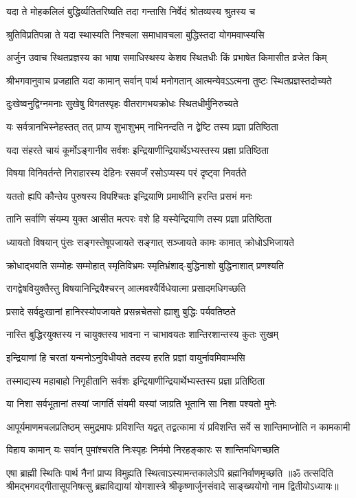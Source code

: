 \twolineshloka
{यदा ते मोहकलिलं बुद्धिर्व्यतितरिष्यति}
{तदा गन्तासि निर्वेदं श्रोतव्यस्य श्रुतस्य च}%

\twolineshloka
{श्रुतिविप्रतिपन्ना ते यदा स्थास्यति निश्चला}
{समाधावचला बुद्धिस्तदा योगमवाप्स्यसि}%

{अर्जुन उवाच}
\twolineshloka
{स्थितप्रज्ञस्य का भाषा समाधिस्थस्य केशव}
{स्थितधीः किं प्रभाषेत किमासीत व्रजेत किम्}%

{श्रीभगवानुवाच}
\twolineshloka
{प्रजहाति यदा कामान् सर्वान् पार्थ मनोगतान्}
{आत्मन्येवऽऽत्मना तुष्टः स्थितप्रज्ञस्तदोच्यते}%

\twolineshloka
{दुःखेष्वनुद्विग्नमनाः सुखेषु विगतस्पृहः}
{वीतरागभयक्रोधः स्थितधीर्मुनिरुच्यते}%

\twolineshloka
{यः सर्वत्रानभिस्नेहस्तत् तत् प्राप्य शुभाशुभम्}
{नाभिनन्दति न द्वेष्टि तस्य प्रज्ञा प्रतिष्ठिता}%

\twolineshloka
{यदा संहरते चायं कूर्मोऽङ्गानीव सर्वशः}
{इन्द्रियाणीन्द्रियार्थेऽभ्यस्तस्य प्रज्ञा प्रतिष्ठिता}%

\twolineshloka
{विषया विनिवर्तन्ते निराहारस्य देहिनः}
{रसवर्जं रसोऽप्यस्य परं दृष्ट्वा निवर्तते}%

\twolineshloka
{यततो ह्यपि कौन्तेय पुरुषस्य विपश्चितः}
{इन्द्रियाणि प्रमाथीनि हरन्ति प्रसभं मनः}%

\twolineshloka
{तानि सर्वाणि संयम्य युक्त आसीत मत्परः}
{वशे हि यस्येन्द्रियाणि तस्य प्रज्ञा प्रतिष्ठिता}%

\twolineshloka
{ध्यायतो विषयान् पुंसः सङ्गस्तेषूपजायते}
{सङ्गात् सञ्जायते कामः कामात् क्रोधोऽभिजायते}%

\twolineshloka
{क्रोधाद्भवति सम्मोहः सम्मोहात् स्मृतिविभ्रमः}
{स्मृतिभ्रंशाद्-बुद्धिनाशो बुद्धिनाशात् प्रणश्यति}%

\twolineshloka
{रागद्वेषवियुक्तैस्तु विषयानिन्द्रियैश्चरन्}
{आत्मवश्यैर्विधेयात्मा प्रसादमधिगच्छति}%

\twolineshloka
{प्रसादे सर्वदुःखानां हानिरस्योपजायते}
{प्रसन्नचेतसो ह्याशु बुद्धिः पर्यवतिष्ठते}%

\twolineshloka
{नास्ति बुद्धिरयुक्तस्य न चायुक्तस्य भावना}
{न चाभावयतः शान्तिरशान्तस्य कुतः सुखम्}%

\twolineshloka
{इन्द्रियाणां हि चरतां यन्मनोऽनुविधीयते}
{तदस्य हरति प्रज्ञां वायुर्नावमिवाम्भसि}%

\twolineshloka
{तस्माद्यस्य महाबाहो निगृहीतानि सर्वशः}
{इन्द्रियाणीन्द्रियार्थेभ्यस्तस्य प्रज्ञा प्रतिष्ठिता}%

\twolineshloka
{या निशा सर्वभूतानां तस्यां जागर्ति संयमी}
{यस्यां जाग्रति भूतानि सा निशा पश्यतो मुनेः}%

\fourlineindentedshloka
{आपूर्यमाणमचलप्रतिष्ठम्}
{समुद्रमापः प्रविशन्ति यद्वत्}
{तद्वत्कामा यं प्रविशन्ति सर्वे}
{स शान्तिमाप्नोति न कामकामी}%

\twolineshloka
{विहाय कामान् यः  सर्वान् पुमांश्चरति निःस्पृहः}
{निर्ममो निरहङ्कारः स शान्तिमधिगच्छति}%

\twolineshloka
{एषा ब्राह्मी स्थितिः पार्थ नैनां प्राप्य विमुह्यति}
{स्थित्वाऽस्यामन्तकालेऽपि ब्रह्मनिर्वाणमृच्छति}%
{॥ॐ तत्सदिति श्रीमद्भगवद्गीतासूपनिषत्सु ब्रह्मविद्यायां योगशास्त्रे श्रीकृष्णार्जुनसंवादे साङ्ख्ययोगो नाम द्वितीयोऽध्यायः॥}